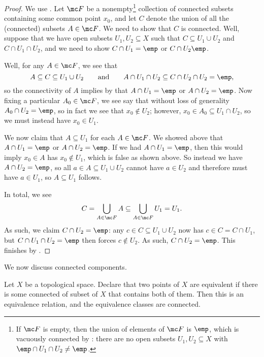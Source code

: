 \documentclass[../notes.tex]{subfiles}
\begin{document}
\begin{proof}
	We use . Let $\mc F$ be a nonempty\footnote{If $\mc F$ is empty, then the union of elements of $\mc F$ is $\emp$, which is vacuously connected by : there are no open subsets $U_1,U_2\subseteq X$ with $\emp\cap U_1\cap U_2\ne\emp$.} collection of connected subsets containing some common point $x_0$, and let $C$ denote the union of all the (connected) subsets $A\in\mc F$. We need to show that $C$ is connected. Well, suppose that we have open subsets $U_1,U_2\subseteq X$ such that $C\subseteq U_1\cup U_2$ and $C\cap U_1\cap U_2$, and we need to show $C\cap U_1=\emp$ or $C\cap U_2\emp$.

	Well, for any $A\in\mc F$, we see that
	\[A\subseteq C\subseteq U_1\cup U_2\qquad\text{and}\qquad A\cap U_1\cap U_2\subseteq C\cap U_2\cap U_2=\emp,\]
	so the connectivity of $A$ implies by  that $A\cap U_1=\emp$ or $A\cap U_2=\emp$. Now fixing a particular $A_0\in\mc F$, we see say that without loss of generality $A_0\cap U_2=\emp$, so in fact we see that $x_0\notin U_2$; however, $x_0\in A_0\subseteq U_1\cap U_2$, so {we must instead have $x_0\in U_1$}.

	We now claim that $A\subseteq U_1$ for each $A\in\mc F$. We showed above that $A\cap U_1=\emp$ or $A\cap U_2=\emp$. If we had $A\cap U_1=\emp$, then this would imply $x_0\in A$ has $x_0\notin U_1$, which is false as shown above. So instead we have $A\cap U_2=\emp$, so all $a\in A\subseteq U_1\cup U_2$ cannot have $a\in U_2$ and therefore must have $a\in U_1$, so $A\subseteq U_1$ follows.

	In total, we see
	\[C=\bigcup_{A\in\mc F}A\subseteq\bigcup_{A\in\mc F}U_1=U_1.\]
	As such, we claim $C\cap U_2=\emp$: any $c\in C\subseteq U_1\cup U_2$ now has $c\in C=C\cap U_1$, but $C\cap U_1\cap U_2=\emp$ then forces $c\notin U_2$. As such, $C\cap U_2=\emp$. This finishes by .
\end{proof}
We now discuss connected components.
\begin{lemma} \label{lem:conncomps}
	Let $X$ be a topological space. Declare that two points of $X$ are equivalent if there is some connected of subset of $X$ that contains both of them. Then this is an equivalence relation, and the equivalence classes are connected.
\end{lemma}
\end{document}
